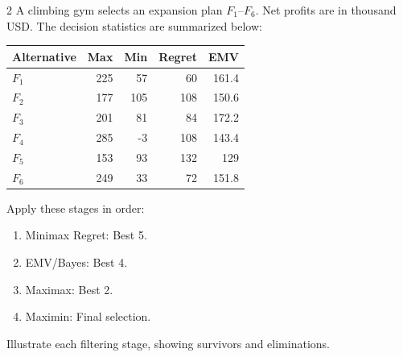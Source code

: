 \begin{multicols}{2}
\raggedcolumns
{}
A climbing gym selects an expansion plan $F_1$--$F_6$. Net profits are in thousand USD. The decision statistics are summarized below:
\vspace{-3mm}
\begin{center}\small\setlength{\tabcolsep}{4pt}
	\begin{tabular}{lrrrr}\toprule
		Alternative & Max & Min & Regret & EMV\\ \midrule
		$F_1$ & 225 & 57 & 60 & 161.4\\
		$F_2$ & 177 & 105 & 108 & 150.6\\
		$F_3$ & 201 & 81 & 84 & 172.2\\
		$F_4$ & 285 & -3 & 108 & 143.4\\
		$F_5$ & 153 & 93 & 132 & 129\\
		$F_6$ & 249 & 33 & 72 & 151.8\\
		\bottomrule
	\end{tabular}
\end{center}
\vspace{-3mm}
Apply these stages in order:
\begin{enumerate}[leftmargin=*]
	\item Minimax Regret: Best 5.
	\item EMV/Bayes: Best 4.
	\item Maximax: Best 2.
	\item Maximin: Final selection.
\end{enumerate}
Illustrate each filtering stage, showing survivors and eliminations.



\end{multicols}
